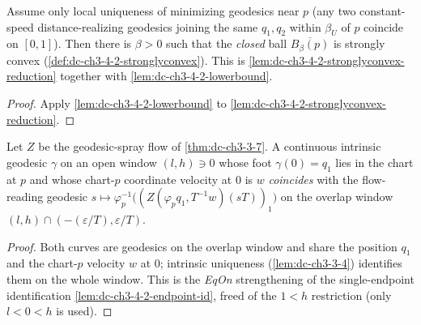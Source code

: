 \begin{lemma}
  \label{lem:dc-ch3-4-2-stronglyconvex-uniq}


  Assume only local uniqueness of minimizing geodesics near $p$ (any two
  constant-speed distance-realizing geodesics joining the same $q_1,q_2$ within $\beta_U$ of $p$
  coincide on $[0,1]$). Then there is $\beta>0$ such that the \emph{closed} ball
  $\overline{B_\beta(p)}$ is strongly convex (\cref{def:dc-ch3-4-2-stronglyconvex}). This is
  \cref{lem:dc-ch3-4-2-stronglyconvex-reduction} together with
  \cref{lem:dc-ch3-4-2-lowerbound}.
\end{lemma}
\begin{proof}
  \sketch

  Apply \cref{lem:dc-ch3-4-2-lowerbound} to
  \cref{lem:dc-ch3-4-2-stronglyconvex-reduction}.
\end{proof}

\begin{lemma}
  \label{lem:dc-ch3-4-2-eqon-flow-reading}


  Let $Z$ be the geodesic-spray flow of \cref{thm:dc-ch3-3-7}. A continuous intrinsic geodesic
  $\gamma$ on an open window $(l,h)\ni0$ whose foot $\gamma(0)=q_1$ lies in the chart at $p$ and whose
  chart-$p$ coordinate velocity at $0$ is $w$ \emph{coincides} with the flow-reading geodesic
  $s\mapsto\varphi_p^{-1}\bigl((Z(\varphi_p q_1,T^{-1}w)(sT))_1\bigr)$ on the overlap window
  $(l,h)\cap(-(\varepsilon/T),\varepsilon/T)$.
\end{lemma}
\begin{proof}
  \sketch

  Both curves are geodesics on the overlap window and share the position $q_1$ and the chart-$p$
  velocity $w$ at $0$; intrinsic uniqueness (\cref{lem:dc-ch3-3-4}) identifies them on the whole
  window. This is the \emph{EqOn} strengthening of the single-endpoint identification
  \cref{lem:dc-ch3-4-2-endpoint-id}, freed of the $1<h$ restriction (only $l<0<h$ is used).
\end{proof}

